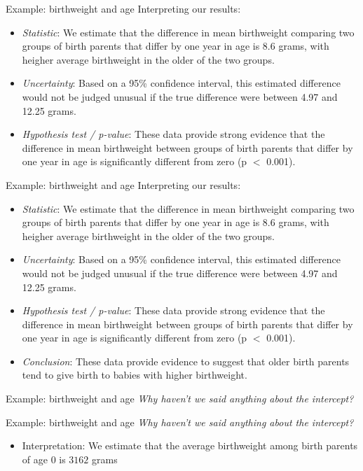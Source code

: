 \documentclass[10pt,t]{beamer}
\begin{document}
\begin{frame}{Example: birthweight and age}
Interpreting our results:
\begin{itemize}
	\item \textit{Statistic}: We estimate that the difference in mean birthweight comparing two groups of birth parents that differ by one year in age is 8.6 grams, with heigher average birthweight in the older of the two groups.
	\item \textit{Uncertainty}: Based on a 95\% confidence interval, this estimated difference would not be judged unusual if the true difference were between 4.97 and 12.25 grams.
	\item \textit{Hypothesis test / p-value}: These data provide strong evidence that the difference in mean birthweight between groups of birth parents that differ by one year in age is significantly different from zero (p $<$ 0.001).
\end{itemize}
\end{frame}

\begin{frame}{Example: birthweight and age}
Interpreting our results:
\begin{itemize}
	\item \textit{Statistic}: We estimate that the difference in mean birthweight comparing two groups of birth parents that differ by one year in age is 8.6 grams, with heigher average birthweight in the older of the two groups.
	\item \textit{Uncertainty}: Based on a 95\% confidence interval, this estimated difference would not be judged unusual if the true difference were between 4.97 and 12.25 grams.
	\item \textit{Hypothesis test / p-value}: These data provide strong evidence that the difference in mean birthweight between groups of birth parents that differ by one year in age is significantly different from zero (p $<$ 0.001).
	\item \textit{Conclusion}: These data provide evidence to suggest that older birth parents tend to give birth to babies with higher birthweight.
\end{itemize}
\end{frame}

\begin{frame}{Example: birthweight and age}
\textit{Why haven't we said anything about the intercept?}
\end{frame}

\begin{frame}{Example: birthweight and age}
\textit{Why haven't we said anything about the intercept?}
\vspace{0.3cm}
\begin{itemize}
	\item Interpretation: We estimate that the average birthweight among birth parents of age $0$ is $3162$ grams
\end{itemize}
\end{frame}
\end{document}
